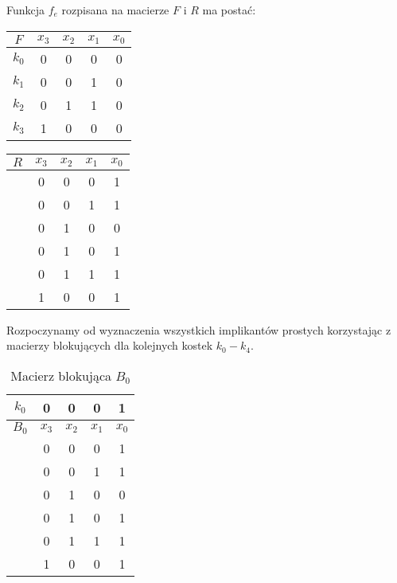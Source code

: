 \setcounter{implicant_counter}{0}
Funkcja $f_e$ rozpisana na macierze $F$ i $R$ ma postać:
\begin{center}
    \begin{tabular}[t]{ |c|c c c c|}
        \hline
        $F$ & $x_3$ & $x_2$ & $x_1$ & $x_0$ \\
        \hline
        $k_0$ & 0 & 0 & 0 & 0 \\
        $k_1$ & 0 & 0 & 1 & 0 \\
        $k_2$ & 0 & 1 & 1 & 0 \\
        $k_3$ & 1 & 0 & 0 & 0 \\
        \hline
    \end{tabular}
    \hspace{1cm}
    \begin{tabular}[t]{ |c|c c c c| }
        \hline
        $R$ & $x_3$ & $x_2$ & $x_1$ & $x_0$ \\
        \hline
        & 0 & 0 & 0 & 1 \\
        & 0 & 0 & 1 & 1 \\
        & 0 & 1 & 0 & 0 \\
        & 0 & 1 & 0 & 1 \\
        & 0 & 1 & 1 & 1 \\
        & 1 & 0 & 0 & 1 \\
        \hline
    \end{tabular}
\end{center}

Rozpoczynamy od wyznaczenia wszystkich implikantów prostych korzystając z macierzy blokujących dla kolejnych kostek
$k_0-k_4$.

\begin{table}[H]
    \centering
    \begin{tabular}[t]{ |c|c c c c| }
        \hline
        $k_0$ & 0 & 0 & 0 & 1 \\
        \hline\hline
        $B_0$ & $x_3$ & $x_2$ & $x_1$ & $x_0$ \\
        \hline
        & 0 & 0 & 0 & 1 \\
        & 0 & 0 & 1 & 1 \\
        & 0 & 1 & 0 & 0 \\
        & 0 & 1 & 0 & 1 \\
        & 0 & 1 & 1 & 1 \\
        & 1 & 0 & 0 & 1 \\
        \hline
    \end{tabular}
    \caption{Macierz blokująca $B_0$} \label{tab:b0}
\end{table}